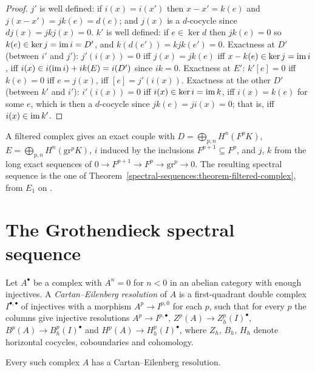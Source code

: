 \begin{proof}
$j'$ is well defined: if $i(x) = i(x')$ then $x - x' = k(e)$ and $j(x - x') = jk(e) = d(e)$; and $j(x)$ is a $d$-cocycle since
$dj(x) = jkj(x) = 0$. $k'$ is well defined: if $e \in \ker d$ then $jk(e) = 0$ so $k(e) \in \ker j = \operatorname{im} i = D'$, and $k(d(e')) = kjk(e') = 0$.
Exactness at $D'$ (between $i'$ and $j'$): $j'(i(x)) = 0$ iff $j(x) = jk(e)$ iff $x - k(e) \in \ker j = \operatorname{im} i$, iff $i(x) \in i(\operatorname{im} i) + ik(E) = i(D')$
since $ik = 0$. Exactness at $E'$: $k'[e] = 0$ iff $k(e) = 0$ iff $e = j(x)$, iff $[e] = j'(i(x))$. Exactness at the other $D'$
(between $k'$ and $i'$): $i'(i(x)) = 0$ iff $i(x) \in \ker i = \operatorname{im} k$, iff $i(x) = k(e)$ for some $e$, which is then a $d$-cocycle since
$jk(e) = ji(x) = 0$; that is, iff $i(x) \in \operatorname{im} k'$.
\end{proof}

\begin{remark}\label{spectral-sequences:remark-exact-couple-filtered}
A filtered complex gives an exact couple with $D = \bigoplus_{p,n}H^n(F^pK)$, $E = \bigoplus_{p,n}H^n(\mathrm{gr}^pK)$, $i$ induced by the inclusions
$F^{p+1} \subseteq F^p$, and $j$, $k$ from the long exact sequences of $0 \to F^{p+1} \to F^p \to \mathrm{gr}^p \to 0$. The resulting spectral sequence is
the one of Theorem~\ref{spectral-sequences:theorem-filtered-complex}, from $E_1$ on \cite[Section 5.9]{weibel-homological}.
\end{remark}

\section{The Grothendieck spectral sequence}\label{spectral-sequences:section-grothendieck}

\begin{definition}\label{spectral-sequences:definition-cartan-eilenberg}
Let $A^\bullet$ be a complex with $A^n = 0$ for $n < 0$ in an abelian category with enough injectives. A \emph{Cartan--Eilenberg resolution}
of $A$ is a first-quadrant double complex $I^{\bullet,\bullet}$ of injectives with a morphism $A^p \to I^{p,0}$ for each $p$, such that for every $p$ the
columns give injective resolutions $A^p \to I^{p,\bullet}$, $Z^p(A) \to Z^p_h(I)^\bullet$, $B^p(A) \to B^p_h(I)^\bullet$ and $H^p(A) \to H^p_h(I)^\bullet$, where
$Z_h$, $B_h$, $H_h$ denote horizontal cocycles, coboundaries and cohomology.
\end{definition}

\begin{lemma}\label{spectral-sequences:lemma-cartan-eilenberg-exists}
Every such complex $A$ has a Cartan--Eilenberg resolution.
\end{lemma}

